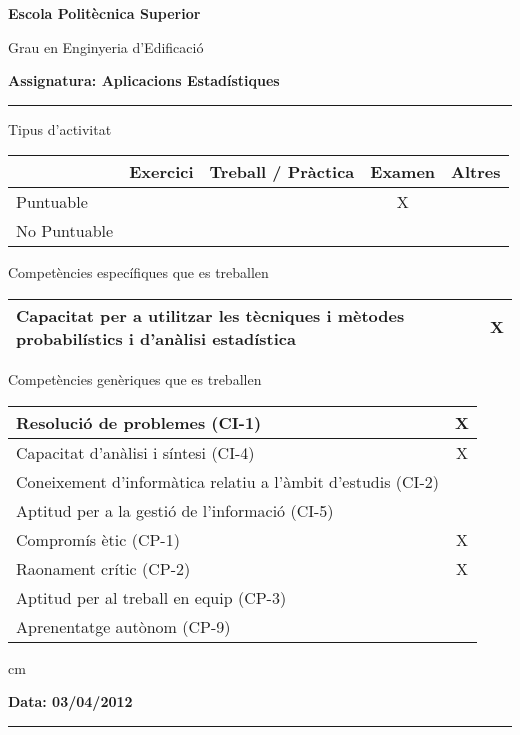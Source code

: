 \documentclass[a4paper,10pt]{article}
\begin{document}
\noindent
{\large \bf Escola Politècnica Superior}

\noindent
{\large Grau en Enginyeria d'Edificació}

\vskip 0.3cm
\noindent
{\large \bf Assignatura: Aplicacions Estadístiques}

\hrule

\vskip 0.3cm

\noindent
Tipus d'activitat

\begin{tabular}{|l|c|c|c|c|}
\hline
 & Exercici & Treball / Pràctica & Examen & Altres \\
\hline
Puntuable & & & X & \\ \hline
No Puntuable & & & & \\ \hline
\end{tabular}

\vskip 0.3cm

\noindent
Competències específiques que es treballen

\begin{tabular}{|l|c|}
\hline
Capacitat per a utilitzar les tècniques i mètodes probabilístics i d'anàlisi estadística & X \\
\hline
\end{tabular}

\vskip 0.3cm

\noindent
Competències genèriques que es treballen

\begin{tabular}{|l|c|}
\hline
Resolució de problemes (CI-1) & X \\ \hline
Capacitat d'anàlisi i síntesi (CI-4) & X \\ \hline
Coneixement d'informàtica relatiu a l'àmbit d'estudis (CI-2) & \\ \hline
Aptitud per a la gestió de l'informació (CI-5) & \\ \hline
Compromís ètic (CP-1) & X \\ \hline
Raonament crític (CP-2) & X \\ \hline
Aptitud per al treball en equip (CP-3) & \\ \hline
Aprenentatge autònom (CP-9) & \\ \hline
\end{tabular}


 cm

\noindent
\textbf{Data: 03/04/2012}

\hrule

\vspace{0.3 cm}
\end{document}
